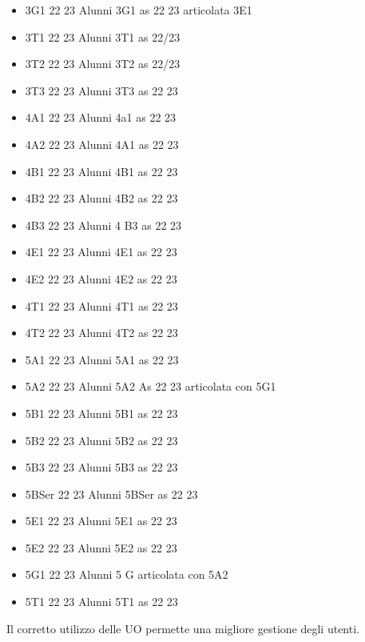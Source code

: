 \begin{itemize}
\begin{itemize}
\begin{itemize}
	\item 3G1 22 23
	Alunni 3G1 as 22 23 articolata 3E1	
	\item 3T1 22 23
	Alunni 3T1 as 22/23	
	\item 3T2 22 23
	Alunni 3T2 as 22/23	
	\item 3T3 22 23
	Alunni 3T3 as 22 23	
	\item 4A1 22 23
	Alunni 4a1 as 22 23	
	\item 4A2 22 23
	Alunni 4A1 as 22 23	
	\item 4B1 22 23
	Alunni 4B1 as 22 23	
	\item 4B2 22 23
	Alunni 4B2 as 22 23	
	\item 4B3 22 23
	Alunni 4 B3 as 22 23	
	\item 4E1 22 23
	Alunni 4E1 as 22 23	
	\item 4E2 22 23
	Alunni 4E2 as 22 23	
	\item 4T1 22 23
	Alunni 4T1 as 22 23	
	\item 4T2 22 23
	Alunni 4T2 as 22 23	
	\item 5A1 22 23
	Alunni 5A1 as 22 23	
	\item 5A2 22 23
	Alunni 5A2 As 22 23 articolata con 5G1	
	\item 5B1 22 23
	Alunni 5B1 as 22 23	
	\item 5B2 22 23
	Alunni 5B2 as 22 23	
	\item 5B3 22 23
	Alunni 5B3 as 22 23	
	\item 5BSer 22 23
	Alunni 5BSer as 22 23	
	\item 5E1 22 23
	Alunni 5E1 as 22 23	
	\item 5E2 22 23
	Alunni 5E2 as 22 23	
	\item 5G1 22 23
	Alunni 5 G articolata con 5A2	
	\item 5T1 22 23
	Alunni 5T1 as 22 23	
	\end{itemize}
	\end{itemize}
\end{itemize} 

Il corretto utilizzo delle UO permette  una  migliore gestione degli utenti.